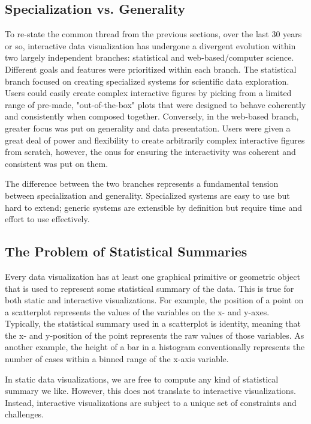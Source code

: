 \documentclass[12pt,a4paper]{article}
\begin{document}
\subsection{Specialization vs. Generality}

To re-state the common thread from the previous sections, over the last 30 years or so, interactive data visualization has undergone a divergent evolution within two largely independent branches: statistical and web-based/computer science. Different goals and features were prioritized within each branch. The statistical branch focused on creating specialized systems for scientific data exploration. Users could easily create complex interactive figures by picking from a limited range of pre-made, "out-of-the-box" plots that were designed to behave coherently and consistently when composed together. Conversely, in the web-based branch, greater focus was put on generality and data presentation. Users were given a great deal of power and flexibility to create arbitrarily complex interactive figures from scratch, however, the onus for ensuring the interactivity was coherent and consistent was put on them.

The difference between the two branches represents a fundamental tension between specialization and generality. Specialized systems are easy to use but hard to extend; generic systems are extensible by definition but require time and effort to use effectively.  

\subsection{The Problem of Statistical Summaries}

Every data visualization has at least one graphical primitive or geometric object that is used to represent some statistical summary of the data. This is true for both static and interactive visualizations. For example, the position of a point on a scatterplot represents the values of the variables on the x- and y-axes. Typically, the statistical summary used in a scatterplot is identity, meaning that the x- and y-position of the point represents the raw values of those variables. As another example, the height of a bar in a histogram conventionally represents the number of cases within a binned range of the x-axis variable. 

In static data visualizations, we are free to compute any kind of statistical summary we like. However, this does not translate to interactive visualizations. Instead, interactive visualizations are subject to a unique set of constraints and challenges.
\end{document}

